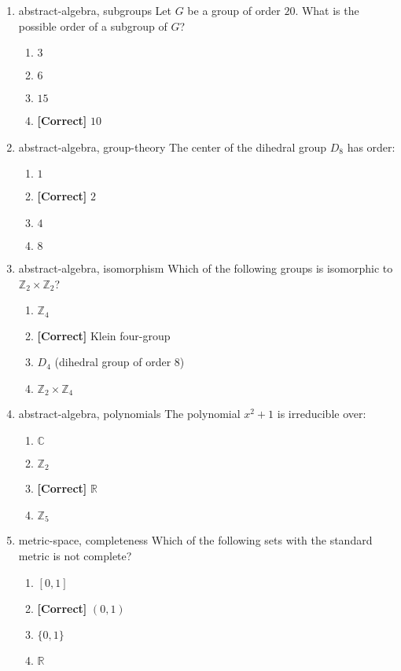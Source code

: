 \documentclass{article}
\newenvironment{problem}{\item}{}
\newcommand{\choice}{\item}
\newcommand{\correctchoice}{\item \textbf{[Correct] }}
\newcommand{\tags}[1]{#1} %
\begin{document}
\begin{enumerate}
        \begin{problem}
            \tags{abstract-algebra, subgroups}
            Let $G$ be a group of order $20$. What is the possible order of a subgroup of $G$?
            \begin{enumerate}
                \choice $3$
                \choice $6$
                \choice $15$
                \correctchoice $10$
            \end{enumerate}
        \end{problem}
        
        \begin{problem}
            \tags{abstract-algebra, group-theory}
            The center of the dihedral group $D_8$ has order:
            \begin{enumerate}
                \choice $1$
                \correctchoice $2$
                \choice $4$
                \choice $8$
            \end{enumerate}
        \end{problem}
        
        \begin{problem}
            \tags{abstract-algebra, isomorphism}
            Which of the following groups is isomorphic to $\mathbb{Z}_2 \times \mathbb{Z}_2$?
            \begin{enumerate}
                \choice $\mathbb{Z}_4$
                \correctchoice Klein four-group
                \choice $D_4$ (dihedral group of order $8$)
                \choice $\mathbb{Z}_2 \times \mathbb{Z}_4$
            \end{enumerate}
        \end{problem}
        
        \begin{problem}
            \tags{abstract-algebra, polynomials}
            The polynomial $x^2 + 1$ is irreducible over:
            \begin{enumerate}
                \choice $\mathbb{C}$
                \choice $\mathbb{Z}_2$
                \correctchoice $\mathbb{R}$
                \choice $\mathbb{Z}_5$
            \end{enumerate}
        \end{problem}

        \begin{problem}
            \tags{metric-space, completeness}
            Which of the following sets with the standard metric is not complete?
            \begin{enumerate}
                \choice $[0,1]$
                \correctchoice $(0,1)$
                \choice $\{0, 1\}$
                \choice $\mathbb{R}$
            \end{enumerate}
        \end{problem}
        

\end{enumerate}
\end{document}
